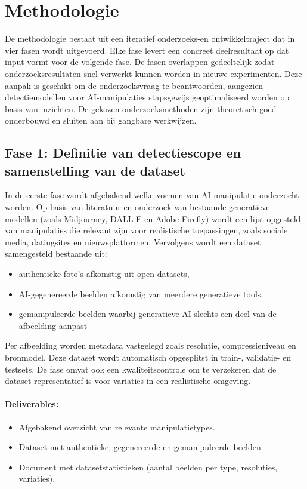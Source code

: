 \documentclass{hogent-article}
\begin{document}
\section{Methodologie}
\label{sec:methodologie}

De methodologie bestaat uit een iteratief onderzoeks-en ontwikkeltraject dat in vier fasen wordt uitgevoerd. Elke fase levert een concreet deelresultaat op dat input vormt voor de volgende fase. De fasen overlappen gedeeltelijk zodat onderzoeksresultaten snel verwerkt kunnen worden in nieuwe experimenten. Deze aanpak is geschikt om de onderzoeksvraag te beantwoorden, aangezien detectiemodellen voor AI-manipulaties stapsgewijs geoptimaliseerd worden op basis van inzichten. De gekozen onderzoeksmethoden zijn theoretisch goed onderbouwd en sluiten aan bij gangbare werkwijzen.

\subsection{Fase 1: Definitie van detectiescope en samenstelling van de dataset}

In de eerste fase wordt afgebakend welke vormen van AI-manipulatie onderzocht worden. Op basis van literatuur en onderzoek van bestaande generatieve modellen (zoals Midjourney, DALL-E en Adobe Firefly) wordt een lijst opgesteld van manipulaties die relevant zijn voor realistische toepassingen, zoals sociale media, datingsites en nieuwsplatformen. Vervolgens wordt een dataset samengesteld bestaande uit:

\begin{itemize}
    \item authentieke foto's afkomstig uit open datasets,
    \item AI-gegenereerde beelden afkomstig van meerdere generatieve tools,
    \item gemanipuleerde beelden waarbij generatieve AI slechts een deel van de afbeelding aanpast
\end{itemize}

Per afbeelding worden metadata vastgelegd zoals resolutie, compressieniveau en bronmodel. Deze dataset wordt automatisch opgesplitst in train-, validatie- en testsets. De fase omvat ook een kwaliteitscontrole om te verzekeren dat de dataset representatief is voor variaties in een realistische omgeving.

\paragraph{Deliverables:}
\begin{itemize}
    \item Afgebakend overzicht van relevante manipulatietypes.
    \item Dataset met authentieke, gegenereerde en gemanipuleerde beelden
    \item Document met datasetstatistieken (aantal beelden per type, resoluties, variaties).
\end{itemize}
\end{document}
